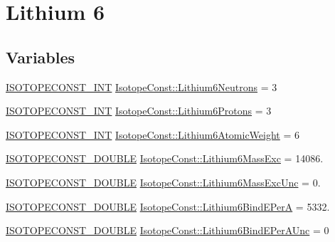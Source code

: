 \hypertarget{group___isotope_const-_lithium-_li6}{}\section{Lithium 6}
\label{group___isotope_const-_lithium-_li6}
\subsection*{Variables}
\begin{DoxyCompactItemize}
\item 
\mbox{\hyperlink{group___isotope_const-_macros_ga5f18360b3e99483a35c32d789e62621c}{I\+S\+O\+T\+O\+P\+E\+C\+O\+N\+S\+T\+\_\+\+I\+NT}} \mbox{\hyperlink{group___isotope_const-_lithium-_li6_ga36a4fc1a617d2cddd8fd9601546ae388}{Isotope\+Const\+::\+Lithium6\+Neutrons}} = 3
\item 
\mbox{\hyperlink{group___isotope_const-_macros_ga5f18360b3e99483a35c32d789e62621c}{I\+S\+O\+T\+O\+P\+E\+C\+O\+N\+S\+T\+\_\+\+I\+NT}} \mbox{\hyperlink{group___isotope_const-_lithium-_li6_gad3c308389e583ba6131c55ac987900e6}{Isotope\+Const\+::\+Lithium6\+Protons}} = 3
\item 
\mbox{\hyperlink{group___isotope_const-_macros_ga5f18360b3e99483a35c32d789e62621c}{I\+S\+O\+T\+O\+P\+E\+C\+O\+N\+S\+T\+\_\+\+I\+NT}} \mbox{\hyperlink{group___isotope_const-_lithium-_li6_ga53c4511cc442e34712ed3d78559eec34}{Isotope\+Const\+::\+Lithium6\+Atomic\+Weight}} = 6
\item 
\mbox{\hyperlink{group___isotope_const-_macros_ga8f45a7272ce02c0b4c65c44636ed719a}{I\+S\+O\+T\+O\+P\+E\+C\+O\+N\+S\+T\+\_\+\+D\+O\+U\+B\+LE}} \mbox{\hyperlink{group___isotope_const-_lithium-_li6_gaad7bbc1e07caef7d5bbc0472258579e0}{Isotope\+Const\+::\+Lithium6\+Mass\+Exc}} = 14086.
\item 
\mbox{\hyperlink{group___isotope_const-_macros_ga8f45a7272ce02c0b4c65c44636ed719a}{I\+S\+O\+T\+O\+P\+E\+C\+O\+N\+S\+T\+\_\+\+D\+O\+U\+B\+LE}} \mbox{\hyperlink{group___isotope_const-_lithium-_li6_gafb5a9c92c988a7004a97a9b101c7b5c5}{Isotope\+Const\+::\+Lithium6\+Mass\+Exc\+Unc}} = 0.
\item 
\mbox{\hyperlink{group___isotope_const-_macros_ga8f45a7272ce02c0b4c65c44636ed719a}{I\+S\+O\+T\+O\+P\+E\+C\+O\+N\+S\+T\+\_\+\+D\+O\+U\+B\+LE}} \mbox{\hyperlink{group___isotope_const-_lithium-_li6_ga7033ea0d46dc1432e32cc0e23eb98da4}{Isotope\+Const\+::\+Lithium6\+Bind\+E\+PerA}} = 5332.
\item 
\mbox{\hyperlink{group___isotope_const-_macros_ga8f45a7272ce02c0b4c65c44636ed719a}{I\+S\+O\+T\+O\+P\+E\+C\+O\+N\+S\+T\+\_\+\+D\+O\+U\+B\+LE}} \mbox{\hyperlink{group___isotope_const-_lithium-_li6_gad9cc80e8a6f4c64c725c4666e4847179}{Isotope\+Const\+::\+Lithium6\+Bind\+E\+Per\+A\+Unc}} = 0

\end{DoxyCompactItemize}
